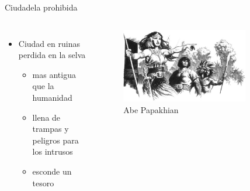 \begin{frame}{Ciudadela prohibida}
	\begin{columns}
		\begin{itemize}
			\item Ciudad en ruinas perdida en la selva
			\begin{itemize}
				\item mas antigua que la humanidad
				\item llena de trampas y peligros para los intrusos
				\item esconde un tesoro
			\end{itemize}
		\end{itemize}
		\begin{figure}[htb]
			\centering
			\includegraphics[width=0.8\textwidth]{img/tributos/elephant07}
			\caption{Abe Papakhian}
		\end{figure}
	\end{columns}
\end{frame}
\note[itemize]{
	\item
}

